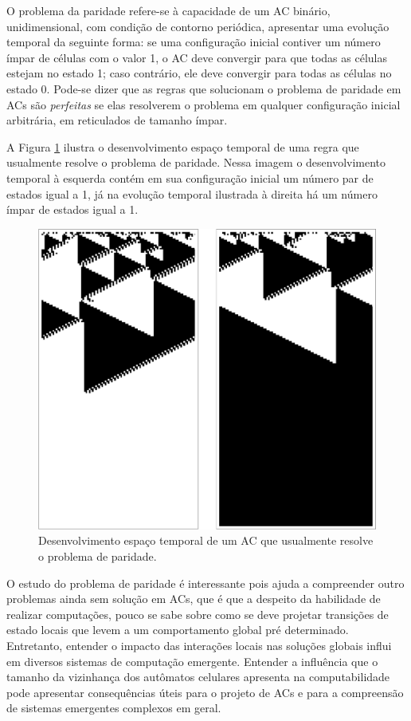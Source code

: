 \documentclass[12pt,a4paper]{article}
\begin{document}
O problema da paridade refere-se à capacidade de um AC binário, unidimensional, com condição de contorno periódica, apresentar uma evolução temporal da seguinte forma: se uma configuração inicial contiver um número ímpar de células com o valor 1, o AC deve convergir para que todas as células estejam no estado 1; caso contrário, ele deve convergir para todas as células no estado 0. Pode-se dizer que as regras que solucionam o problema de paridade em ACs são \textit{perfeitas} se elas resolverem o problema em qualquer configuração inicial arbitrária, em reticulados de tamanho ímpar. 

A Figura \ref{fig:parity-rule} ilustra o desenvolvimento espaço temporal de uma regra que usualmente resolve o problema de paridade. Nessa imagem o desenvolvimento temporal à esquerda contém em sua configuração inicial um número par de estados igual a 1, já na evolução temporal ilustrada à direita há um número ímpar de estados igual a 1.

\begin{figure}[h!]
  \centering
  \includegraphics[width=.7\textwidth]{regra1}
    \caption{Desenvolvimento espaço temporal de um AC que usualmente resolve o problema de paridade.}
    \label{fig:parity-rule}
\end{figure}


O estudo do problema de paridade é interessante pois ajuda a compreender outro problemas ainda sem solução em ACs, que é que a despeito da habilidade de realizar computações, pouco se sabe sobre como se deve projetar transições de estado locais que levem a um comportamento global pré determinado. Entretanto, entender o impacto das interações locais nas soluções globais influi em diversos sistemas de computação emergente. Entender a influência que o tamanho da vizinhança dos autômatos celulares apresenta na computabilidade pode apresentar consequências úteis para o projeto de ACs e para a compreensão de sistemas emergentes complexos em geral.
\end{document}
